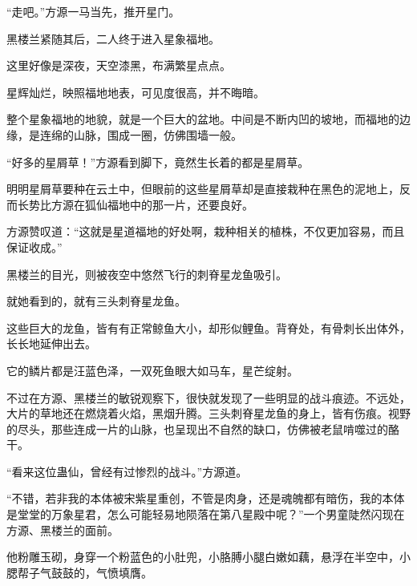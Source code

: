 \begin{this_body}
“走吧。”方源一马当先，推开星门。

黑楼兰紧随其后，二人终于进入星象福地。

这里好像是深夜，天空漆黑，布满繁星点点。

星辉灿烂，映照福地地表，可见度很高，并不晦暗。

整个星象福地的地貌，就是一个巨大的盆地。中间是不断内凹的坡地，而福地的边缘，是连绵的山脉，围成一圈，仿佛围墙一般。

“好多的星屑草！”方源看到脚下，竟然生长着的都是星屑草。

明明星屑草要种在云土中，但眼前的这些星屑草却是直接栽种在黑色的泥地上，反而长势比方源在狐仙福地中的那一片，还要良好。

方源赞叹道：“这就是星道福地的好处啊，栽种相关的植株，不仅更加容易，而且保证收成。”

黑楼兰的目光，则被夜空中悠然飞行的刺脊星龙鱼吸引。

就她看到的，就有三头刺脊星龙鱼。

这些巨大的龙鱼，皆有有正常鲸鱼大小，却形似鲤鱼。背脊处，有骨刺长出体外，长长地延伸出去。

它的鳞片都是汪蓝色泽，一双死鱼眼大如马车，星芒绽射。

不过在方源、黑楼兰的敏锐观察下，很快就发现了一些明显的战斗痕迹。不远处，大片的草地还在燃烧着火焰，黑烟升腾。三头刺脊星龙鱼的身上，皆有伤痕。视野的尽头，那些连成一片的山脉，也呈现出不自然的缺口，仿佛被老鼠啃噬过的酪干。

“看来这位蛊仙，曾经有过惨烈的战斗。”方源道。

“不错，若非我的本体被宋紫星重创，不管是肉身，还是魂魄都有暗伤，我的本体是堂堂的万象星君，怎么可能轻易地陨落在第八星殿中呢？”一个男童陡然闪现在方源、黑楼兰的面前。

他粉雕玉砌，身穿一个粉蓝色的小肚兜，小胳膊小腿白嫩如藕，悬浮在半空中，小腮帮子气鼓鼓的，气愤填膺。

\end{this_body}


